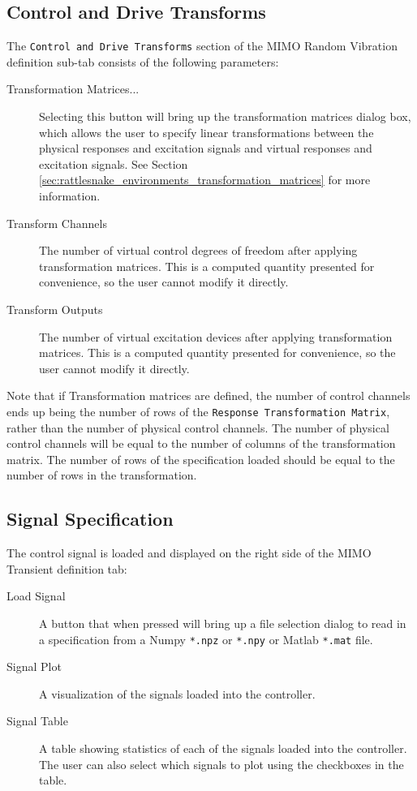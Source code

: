 \documentclass[pdf,12pt,report]{SANDreport}
\newcommand{\inlineCode}{\lstinline[basicstyle=\bfseries\ttfamily]}
\begin{document}
    \subsection{Control and Drive Transforms}
    The \inlineCode{Control and Drive Transforms} section of the \Ac{MIMO} Random Vibration definition sub-tab consists of the following parameters:
    \begin{description}
        \item[Transformation Matrices...] Selecting this button will bring up the transformation matrices dialog box, which allows the user to specify linear transformations between the physical responses and excitation signals and virtual responses and excitation signals.  See Section \ref{sec:rattlesnake_environments_transformation_matrices} for more information.
        \item[Transform Channels] The number of virtual control degrees of freedom after applying transformation matrices.  This is a computed quantity presented for convenience, so the user cannot modify it directly.
        \item[Transform Outputs] The number of virtual excitation devices after applying transformation matrices.  This is a computed quantity presented for convenience, so the user cannot modify it directly.
    \end{description}
    Note that if Transformation matrices are defined, the number of control channels ends up being the number of rows of the \inlineCode{Response Transformation Matrix}, rather than the number of physical control channels.  The number of physical control channels will be equal to the number of columns of the transformation matrix.  The number of rows of the specification loaded should be equal to the number of rows in the transformation.

   \subsection{Signal Specification}
   The control signal is loaded and displayed on the right side of the \Ac{MIMO} Transient definition tab:
   
   \begin{description}
       \item[Load Signal] A button that when pressed will bring up a file selection dialog to read in a specification from a Numpy \inlineCode{*.npz} or \inlineCode{*.npy} or Matlab \inlineCode{*.mat} file.
       \item[Signal Plot] A visualization of the signals loaded into the controller.
       \item[Signal Table] A table showing statistics of each of the signals loaded into the controller.  The user can also select which signals to plot using the checkboxes in the table.
   \end{description}
    
\end{document}
